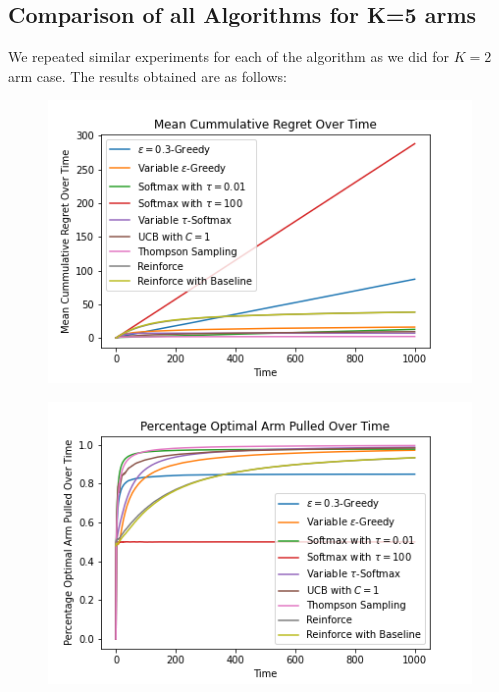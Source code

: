 \documentclass{article}
\begin{document}
		
	\subsection{Comparison of all Algorithms for K=5 arms}
		\label{5_bernoulli_comparison}
		We repeated similar experiments for each of the algorithm as we did for $K=2$ arm case. The results obtained are as follows:
		
		\begin{figure}[H]
			\graphicspath{ {../Experiments/Bernoulli_5_every_case/} }
			\centering
			\begin{minipage}{.5\textwidth}
			  \centering
			  \includegraphics[width=\linewidth]{Mean_Cummulative_Regret_Over_Time.png}
			  \label{fig:test1}
			\end{minipage}%
			\begin{minipage}{.5\textwidth}
			  \centering
			  \includegraphics[width=\linewidth]{Percentage_Optimal_Arm_Pulled_Over_Time.png}
			  \label{fig:test2}
			\end{minipage}
			\end{figure}
			
\end{document}
